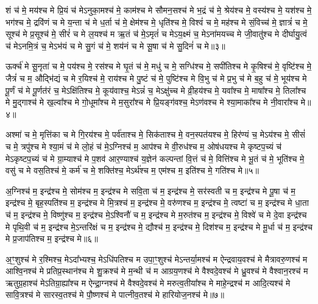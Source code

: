 शं च॑ मे॒ मय॑श्च मे प्रि॒यं च॑ मेऽनुका॒मश्च॑ मे॒ काम॑श्च मे सौमन॒सश्च॑ मे भ॒द्रं च॑ मे॒ श्रेय॑श्च मे॒ वस्य॑श्च मे॒ यश॑श्च मे॒ भग॑श्च मे॒ द्रवि॑णं च मे य॒न्ता च॑ मे ध॒र्ता च॑ मे॒ क्षेम॑श्च मे॒ धृति॑श्च मे॒ विश्वं॑ च मे॒ मह॑श्च मे सं॒विच्च॑ मे॒ ज्ञात्रं॑ च मे॒ सूश्च॑ मे प्र॒सूश्च॑ मे॒ सीरं॑ च मे ल॒यश्च॑ म ऋ॒तं च॑ मे॒ऽमृतं॑ च मेऽय॒क्ष्मं च॒ मेऽना॑मयच्च मे जी॒वातु॑श्च मे दीर्घायु॒त्वं च॑ मेऽनमि॒त्रं च॒ मेऽभ॑यं च मे सु॒गं च॑ मे॒ शय॑नं च मे सू॒षा च॑ मे सु॒दिनं॑ च मे॥३॥

ऊर्क्च॑ मे सू॒नृता॑ च मे॒ पय॑श्च मे॒ रस॑श्च मे घृ॒तं च॑ मे॒ मधु॑ च मे॒ सग्धि॑श्च मे॒ सपी॑तिश्च मे कृ॒षिश्च॑ मे॒ वृष्टि॑श्च मे॒ जैत्रं॑ च म॒ औद्भि॑द्यं च मे र॒यिश्च॑ मे॒ राय॑श्च मे पु॒ष्टं च॑ मे॒ पुष्टि॑श्च मे वि॒भु च॑ मे प्र॒भु च॑ मे ब॒हु च॑ मे॒ भूय॑श्च मे पू॒र्णं च॑ मे पू॒र्णत॑रं च॒ मेऽक्षि॑तिश्च मे॒ कूय॑वाश्च॒ मेऽन्नं॑ च॒ मेऽक्षु॑च्च मे व्री॒हय॑श्च मे॒ यवा᳚श्च मे॒ माषा᳚श्च मे॒ तिला᳚श्च मे मु॒द्गाश्च॑ मे ख॒ल्वा᳚श्च मे गो॒धूमा᳚श्च मे म॒सुरा᳚श्च मे प्रि॒यङ्ग॑वश्च॒ मेऽण॑वश्च मे श्या॒माका᳚श्च मे नी॒वारा᳚श्च मे॥४॥

अश्मा॑ च मे॒ मृत्ति॑का च मे गि॒रय॑श्च मे॒ पर्व॑ताश्च मे॒ सिक॑ताश्च मे॒ वन॒स्पत॑यश्च मे॒ हिर॑ण्यं च॒ मेऽय॑श्च मे॒ सीसं॑ च मे॒ त्रपु॑श्च मे श्या॒मं च॑ मे लो॒हं च॑ मे॒ऽग्निश्च॑ म॒ आप॑श्च मे वी॒रुध॑श्च म॒ ओष॑धयश्च मे कृष्टप॒च्यं च॑ मेऽकृष्टप॒च्यं च॑ मे ग्रा॒म्याश्च॑ मे प॒शव॑ आर॒ण्याश्च॑ य॒ज्ञेन॑ कल्पन्तां वि॒त्तं च॑ मे॒ वित्ति॑श्च मे भू॒तं च॑ मे॒ भूति॑श्च मे॒ वसु॑ च मे वस॒तिश्च॑ मे॒ कर्म॑ च मे॒ शक्ति॑श्च॒ मेऽर्थ॑श्च म॒ एम॑श्च म॒ इति॑श्च मे॒ गति॑श्च मे॥५॥

अ॒ग्निश्च॑ म॒ इन्द्र॑श्च मे॒ सोम॑श्च म॒ इन्द्र॑श्च मे सवि॒ता च॑ म॒ इन्द्र॑श्च मे॒ सर॑स्वती च म॒ इन्द्र॑श्च मे पू॒षा च॑ म॒ इन्द्र॑श्च मे॒ बृह॒स्पति॑श्च म॒ इन्द्र॑श्च मे मि॒त्रश्च॑ म॒ इन्द्र॑श्च मे॒ वरु॑णश्च म॒ इन्द्र॑श्च मे॒ त्वष्टा॑ च म॒ इन्द्र॑श्च मे धा॒ता च॑ म॒ इन्द्र॑श्च मे॒ विष्णु॑श्च म॒ इन्द्र॑श्च मे॒ऽश्विनौ॑ च म॒ इन्द्र॑श्च मे म॒रुत॑श्च म॒ इन्द्र॑श्च मे॒ विश्वे॑ च मे दे॒वा इन्द्र॑श्च मे पृथि॒वी च॑ म॒ इन्द्र॑श्च मे॒ऽन्तरि॑क्षं च म॒ इन्द्र॑श्च मे॒ द्यौश्च॑ म॒ इन्द्र॑श्च मे॒ दिश॑श्च म॒ इन्द्र॑श्च मे मू॒र्धा च॑ म॒ इन्द्र॑श्च मे प्र॒जाप॑तिश्च म॒ इन्द्र॑श्च मे॥६॥

अ॒ꣳ॒शुश्च॑ मे र॒श्मिश्च॒ मेऽदा᳚भ्यश्च॒ मेऽधि॑पतिश्च म उपा॒ꣳ॒शुश्च॑ मेऽन्तर्या॒मश्च॑ म ऐन्द्रवाय॒वश्च॑ मे मैत्रावरु॒णश्च॑ म आश्वि॒नश्च॑ मे प्रतिप्र॒स्थान॑श्च मे शु॒क्रश्च॑ मे म॒न्थी च॑ म आग्रय॒णश्च॑ मे वैश्वदे॒वश्च॑ मे ध्रु॒वश्च॑ मे वैश्वान॒रश्च॑ म ऋतुग्र॒हाश्च॑ मेऽतिग्रा॒ह्या᳚श्च म ऐन्द्रा॒ग्नश्च॑ मे वैश्वदे॒वश्च॑ मे मरुत्व॒तीया᳚श्च मे माहे॒न्द्रश्च॑ म आदि॒त्यश्च॑ मे सावि॒त्रश्च॑ मे सारस्व॒तश्च॑ मे पौ॒ष्णश्च॑ मे पात्नीव॒तश्च॑ मे हारियोज॒नश्च॑ मे॥७॥

